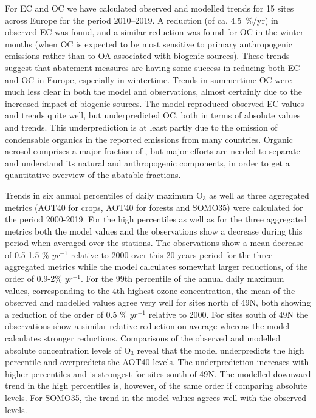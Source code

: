 For EC and OC we have calculated observed and modelled trends for 15 sites across Europe for the period 2010--2019. A reduction (of ca. 4.5~\%/yr) in observed EC was found, and a similar reduction was found for OC in the winter months (when OC is expected to be most sensitive to primary anthropogenic emissions rather than to OA associated with biogenic sources). These trends suggest that abatement measures are having some success in reducing both EC and OC in Europe, especially in wintertime. 
Trends in summertime OC were much less clear in both the model and observations, almost certainly due to the increased impact of biogenic sources.
The model reproduced observed EC values and trends quite well, but underpredicted OC, both in terms of absolute values and trends. This underprediction is at least partly due to the omission of condensable organics in the reported emissions from many countries. 
Organic aerosol comprises a major fraction of \pmfine, but major efforts are needed to separate and understand its natural and anthropogenic components, in order to get a quantitative overview of the abatable fractions.
%



Trends in six annual percentiles of daily maximum O$_3$ as well as three aggregated metrics (AOT40 for crops, AOT40 for forests and SOMO35) were calculated for the period 2000-2019. For the high percentiles as well as for the three aggregated metrics both the model values and the observations show a decrease during this period when averaged over the stations. The observations show a mean decrease of 0.5-1.5 \% $yr^{-1}$ relative to 2000 over this 20 years period for the three aggregated metrics while the model calculates somewhat larger reductions, of the order of 0.9-2\% $yr^{-1}$. For the 99th percentile of the annual daily maximum values, corresponding to the 4th highest ozone concentration, the mean of the observed and modelled values agree very well for sites north of 49\degrees N, both showing a reduction of the order of 0.5  \% $yr^{-1}$ relative to 2000. For sites south of 49\degrees N the observations show a similar relative reduction on average whereas the model calculates stronger reductions. Comparisons of the observed and modelled absolute concentration levels of O$_3$ reveal that the model underpredicts the high percentile and overpredicts the AOT40 levels. The underprediction increases with higher percentiles and is strongest for sites south of 49\degrees N. The modelled downward trend in the high percentiles is, however, of the same order if comparing absolute levels. For SOMO35, the trend in the model values agrees well with the observed levels.

